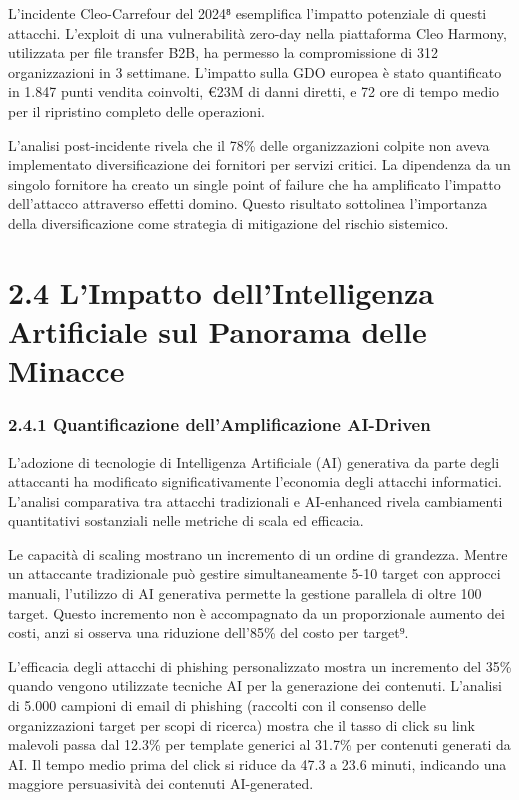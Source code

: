 \documentclass[12pt,a4paper,oneside]{book}
\begin{document}
L'incidente Cleo-Carrefour del 2024⁸ esemplifica l'impatto potenziale di
questi attacchi. L'exploit di una vulnerabilità zero-day nella
piattaforma Cleo Harmony, utilizzata per file transfer B2B, ha permesso
la compromissione di 312 organizzazioni in 3 settimane. L'impatto sulla
GDO europea è stato quantificato in 1.847 punti vendita coinvolti, €23M
di danni diretti, e 72 ore di tempo medio per il ripristino completo
delle operazioni.

L'analisi post-incidente rivela che il 78\% delle organizzazioni colpite
non aveva implementato diversificazione dei fornitori per servizi
critici. La dipendenza da un singolo fornitore ha creato un single point
of failure che ha amplificato l'impatto dell'attacco attraverso effetti
domino. Questo risultato sottolinea l'importanza della diversificazione
come strategia di mitigazione del rischio sistemico.

\section{2.4 L'Impatto dell'Intelligenza Artificiale sul Panorama
delle
Minacce}\label{limpatto-dellintelligenza-artificiale-sul-panorama-delle-minacce}

\subsubsection{2.4.1 Quantificazione dell'Amplificazione
AI-Driven}\label{quantificazione-dellamplificazione-ai-driven}

L'adozione di tecnologie di Intelligenza Artificiale (AI) generativa da
parte degli attaccanti ha modificato significativamente l'economia degli
attacchi informatici. L'analisi comparativa tra attacchi tradizionali e
AI-enhanced rivela cambiamenti quantitativi sostanziali nelle metriche
di scala ed efficacia.

Le capacità di scaling mostrano un incremento di un ordine di grandezza.
Mentre un attaccante tradizionale può gestire simultaneamente 5-10
target con approcci manuali, l'utilizzo di AI generativa permette la
gestione parallela di oltre 100 target. Questo incremento non è
accompagnato da un proporzionale aumento dei costi, anzi si osserva una
riduzione dell'85\% del costo per target⁹.

L'efficacia degli attacchi di phishing personalizzato mostra un
incremento del 35\% quando vengono utilizzate tecniche AI per la
generazione dei contenuti. L'analisi di 5.000 campioni di email di
phishing (raccolti con il consenso delle organizzazioni target per scopi
di ricerca) mostra che il tasso di click su link malevoli passa dal
12.3\% per template generici al 31.7\% per contenuti generati da AI. Il
tempo medio prima del click si riduce da 47.3 a 23.6 minuti, indicando
una maggiore persuasività dei contenuti AI-generated.
\end{document}
